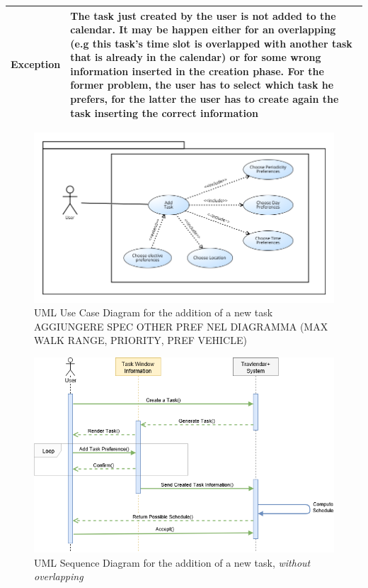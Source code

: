 \begin{table}[H]
\begin{tabular}{|p{3.5cm}|p{10.3cm}|}
    \hline
    \textbf{\large{Exception}} 			& The task just created by the user is not added to the calendar. It may be happen either for an overlapping (e.g this task's time slot is overlapped with another task that is already in the calendar) or for some wrong information inserted in the creation phase. For the former problem, the user has to select which task he prefers, for the latter the user has to create again the task inserting the correct information \\
    
    \hline
    
    
    \end{tabular}
	
\end{table}

\begin{figure}[H]
\centering
\includegraphics[scale=0.5]{Pictures/UseCaseDiagram/Adding_a_new_task.png}
\caption{UML Use Case Diagram for the addition of a new task AGGIUNGERE SPEC OTHER PREF NEL DIAGRAMMA (MAX WALK RANGE, PRIORITY, PREF VEHICLE) }
\end{figure}

\begin{figure}[H]
\centering
\includegraphics[scale=0.5]{Pictures/SequenceDiagram/adding_a_task.png}
\caption{UML Sequence Diagram for the addition of a new task, \emph{without overlapping}}
\end{figure}

